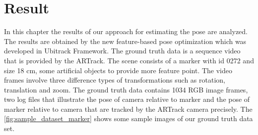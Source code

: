 \chapter{Result}\label{chapter:Result}
In this chapter the results of our approach for estimating the pose are analyzed. The results are obtained by the new feature-based pose optimization which was developed in Ubitrack Framework. The ground truth data is a sequence video that is provided by the ARTrack. The scene consists of a marker with id 0272 and size 18 cm, some artificial objects to provide more feature point. The video frames involve three difference types of transformations such as rotation, translation and zoom. The ground truth data contains 1034 RGB image frames, two log files that illustrate the pose of camera relative to marker and the pose of marker relative to camera that are tracked by the ARTrack camera precisely. The \autoref{fig:sample_dataset_marker} shows some sample images of our ground truth data set.

